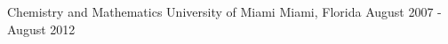 

\begin{cventries}

  \cventry
    {Chemistry and Mathematics} %
    {University of Miami} %
    {Miami, Florida} %
    {August 2007 - August 2012} %
    { }

\end{cventries}
